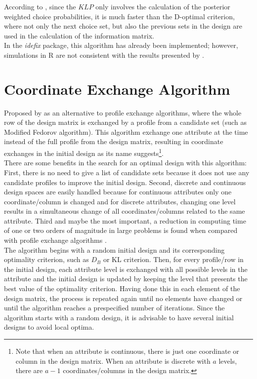 \documentclass[12pt,a4paper,oneside]{article}
\begin{document}
\noindent According to \citet{Crabbe2014}, since the $KLP$ only involves the calculation of the posterior weighted choice probabilities, it is much faster than the D-optimal criterion, where not only the next choice set, but also the previous sets in the design are used in the calculation of the information matrix.\\

\noindent In the \textit{idefix} package, this algorithm has already been implemented; however, simulations in R are not consistent with the results presented by \citet{Crabbe2014}.

\section{Coordinate Exchange Algorithm}
Proposed by \citet{Meyer1995} as an alternative to profile exchange algorithms, where the whole row of the design matrix is exchanged by a profile from a candidate set (such as Modified Fedorov algorithm). This algorithm exchange one attribute at the time instead of the full profile from the design matrix, resulting in coordinate exchanges in the initial design as its name suggests\footnote{Note that when an attribute is continuous, there is just one coordinate or column in the design matrix. When an attribute is discrete with $a$ levels, there are $a-1$ coordinates/columns in the design matrix.}.\\

\noindent There are some benefits in the search for an optimal design with this algorithm: First, there is no need to give a list of candidate sets because it does not use any candidate profiles to improve the initial design. Second, discrete and continuous design spaces are easily handled because for continuous attributes only one coordinate/column is changed and for discrete attributes, changing one level results in a simultaneous change of all coordinates/columns related to the same attribute. Third and maybe the most important, a reduction in computing time of one or two orders of magnitude in large problems is found when compared with profile exchange algorithms \citep{Meyer1995}.\\

\noindent The algorithm begins with a random initial design and its corresponding optimality criterion, such as $D_B$ or KL criterion. Then, for every profile/row in the initial design, each attribute level is exchanged with all possible levels in the attribute and the initial design is updated by keeping the level that presents the best value of the optimality criterion. Having done this in each element of the design matrix, the process is repeated again until no elements have changed or until the algorithm reaches a prespecified number of iterations. Since the algorithm starts with a random design, it is advisable to have several initial designs to avoid local optima.
\end{document}
